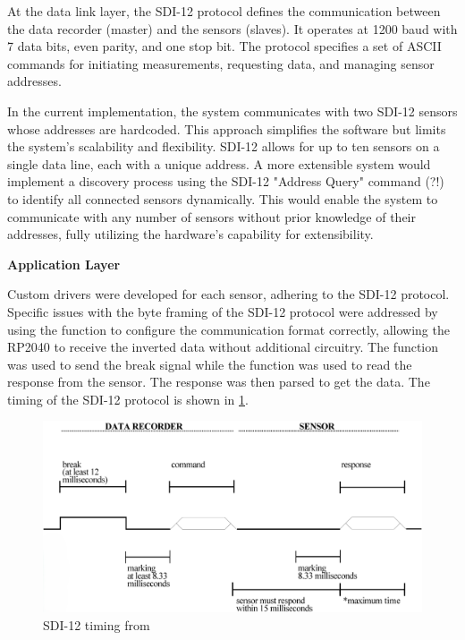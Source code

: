 At the data link layer, the SDI-12 protocol defines the communication between the data recorder 
(master) and the sensors (slaves). It operates at 1200 baud with 7 data bits, even parity, and one 
stop bit. The protocol specifies a set of ASCII commands for initiating measurements, requesting 
data, and managing sensor addresses.

In the current implementation, the system communicates with two SDI-12 sensors whose addresses are 
hardcoded. This approach simplifies the software but limits the system's scalability and flexibility. 
SDI-12 allows for up to ten sensors on a single data line, each with a unique address. A more extensible 
system would implement a discovery process using the SDI-12 "Address Query" command (?!) to identify 
all connected sensors dynamically. This would enable the system to communicate with any number of sensors 
without prior knowledge of their addresses, fully utilizing the hardware's capability for extensibility.

\textbf{Application Layer}

Custom drivers were developed for each sensor, adhering to the SDI-12 
protocol. Specific issues with the byte framing of the SDI-12 protocol were addressed by using the 
 function to configure the communication format correctly, allowing the RP2040 
to receive the inverted data without additional circuitry. The  function was used to 
send the break signal while the  function was used to read the response from 
the sensor. The response was then parsed to get the data. The timing of the SDI-12 protocol is shown 
in \cref{sdi12_timing}.

\begin{figure}
    \includegraphics[width=\linewidth]{figures/SDI-12_timing.png}
    \caption{SDI-12 timing from \cite{sdi12_datasheet}}
    \label{sdi12_timing}
\end{figure}

